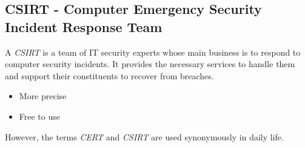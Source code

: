 \subsection{CSIRT - Computer Emergency Security Incident Response Team}
A \textit{CSIRT} is a team of IT security experts whose main business is to respond to computer security incidents. It provides the necessary services to handle them and support their constituents to
recover from breaches.\\

\begin{itemize}
    \item More precise
    \item Free to use\\
\end{itemize}

However, the terms \textit{CERT} and \textit{CSIRT} are used synonymously in daily life.